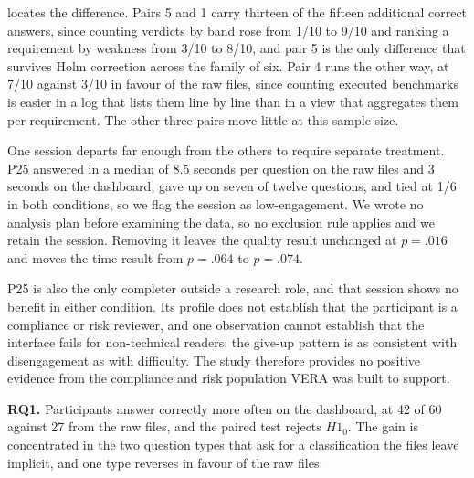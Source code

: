 \documentclass[10pt,conference,a4paper]{IEEEtran}
\providecommand{\rqbox}[2]{%
  \begin{tcolorbox}[
    colback=green!10,
    colframe=rqgreen,
    arc=1mm,
    boxrule=0.5pt,
    left=1mm,
    right=1mm,
    top=0.5mm,
    bottom=0.5mm,
    before skip=4pt,
    after skip=4pt
  ]
  \textbf{#1.} #2
  \end{tcolorbox}%
}
\begin{document}
 locates the difference.
Pairs 5 and 1 carry thirteen of the fifteen additional correct answers, since counting verdicts by band rose from 1/10 to 9/10 and ranking a requirement by weakness from 3/10 to 8/10, and pair 5 is the only difference that survives Holm correction across the family of six.
Pair 4 runs the other way, at 7/10 against 3/10 in favour of the raw files, since counting executed benchmarks is easier in a log that lists them line by line than in a view that aggregates them per requirement.
The other three pairs move little at this sample size.

One session departs far enough from the others to require separate treatment.
P25 answered in a median of 8.5 seconds per question on the raw files and 3 seconds on the dashboard, gave up on seven of twelve questions, and tied at 1/6 in both conditions, so we flag the session as low-engagement.
We wrote no analysis plan before examining the data, so no exclusion rule applies and we retain the session.
Removing it leaves the quality result unchanged at $p = .016$ and moves the time result from $p = .064$ to $p = .074$.

P25 is also the only completer outside a research role, and that session shows no benefit in either condition.
Its profile does not establish that the participant is a compliance or risk reviewer, and one observation cannot establish that the interface fails for non-technical readers; the give-up pattern is as consistent with disengagement as with difficulty.
The study therefore provides no positive evidence from the compliance and risk population VERA was built to support.

\rqbox{RQ1}{Participants answer correctly more often on the dashboard, at 42 of 60 against 27 from the raw files, and the paired test rejects $H1_0$. The gain is concentrated in the two question types that ask for a classification the files leave implicit, and one type reverses in favour of the raw files.}
\end{document}
